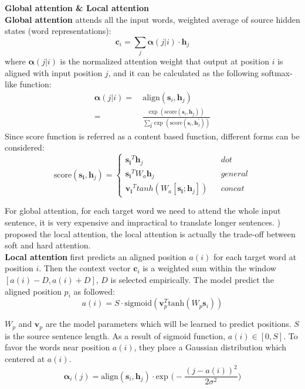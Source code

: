 \textbf{Global attention \& Local attention } \\
\textbf{Global attention} attends all the input words, weighted average of source hidden states (word representations):
\[ \bm{c}_i = \sum_{j} \bm{\alpha}(j|i)\cdot  \bm{h}_j \]
where $\bm{\alpha}(j|i)$ is the normalized attention weight that output at position $i$ is aligned with input position $j$, and it can be calculated as the following softmax-like function:
\begin{align}
\bm{\alpha}(j|i) = & \ \text{align}(\bm{s}_i, {\bm{h}}_j) \\
= & \ \frac{\text{exp\ }(\text{score}(\bm{s}_i, {\bm{h}}_j))}{\sum_{\bm{j}^{\prime}} \text{exp\ }(\text{score}(\bm{s}_i, {\bm{h}}_j^{\prime}))}
\end{align}
Since score function is referred as a content based function, different forms can be considered:
\begin{equation}
\text{score}(\bm{s_i}, {\bm{h}}_j)=\left\{
\begin{array}{lcl}
{\bm{s_i}}^T {\bm{h}}_j & & dot\\
{\bm{s_i}}^T W_a {\bm{h}}_j & & general\\
{\bm{v_i}}^T tanh(W_a[\bm{s_i}; {\bm{h}}_j]) & & concat
\end{array} \right.
\end{equation}



For global attention, for each target word we need to attend the whole input sentence, it is very expensive and impractical to translate longer sentences. \cite{luong2015effective}) proposed the local attention, the local attention is actually the  trade-off between soft and hard attention. \\
\textbf{Local attention} first predicts an aligned position ${a(i)}$ for each target word at position $i$. Then the context vector ${\bm{c}_i}$ is a weighted sum within the window ${[a(i)-D, a(i)+D]}$, ${D}$ is selected empirically. The model predict the aligned  position ${p_i}$ as followed:
\[ a(i) = S \cdot \text{sigmoid}(\bm{v}_p^T \text{tanh}(W_p \bm{s}_i))\]

${W_p}$ and ${\bm{v}_p}$ are the model parameters which will be learned to predict positions. $S$ is the source sentence length. As a result of sigmoid function, $a(i) \in [0, S]$. To favor the words near position ${a(i)}$, they place a Gaussian distribution which centered at ${a(i)}$.
\[\bm{\alpha}_i(j) = \text{align}(\bm{s}_i, {\bm{h}}_j) \cdot \text{exp\ }\Big(-\frac{(j-a(i))^2}{2 \sigma^2}\Big) \]

